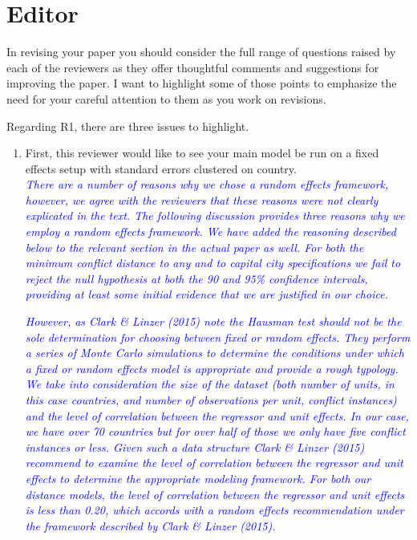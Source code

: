 \section{Editor}


In revising your paper you should consider the full range of questions raised by each of the reviewers as they offer thoughtful comments and suggestions for improving the paper. I want to highlight some of those points to emphasize the need for your careful attention to them as you work on revisions.

Regarding R1, there are three issues to highlight. 
\begin{enumerate}
\item  First, this reviewer would like to see your main model be run on a fixed effects setup with standard errors clustered on country. \\

\textcolor{blue}{\emph{
	There are a number of reasons why we chose a random effects framework, however, we agree with the reviewers that these reasons were not clearly explicated in the text. The following discussion provides three reasons why we employ a random effects framework. We have added the reasoning described below to the relevant section in the actual paper as well.
	For both the minimum conflict distance to any and to capital city specifications we fail to reject the null hypothesis at both the 90 and 95\% confidence intervals, providing at least some initial evidence that we are justified in our choice.
}}

\textcolor{blue}{\emph{
	However, as Clark \& Linzer (2015) note the Hausman test should not be the sole determination for choosing between fixed or random effects. They perform a series of Monte Carlo simulations to determine the conditions under which a fixed or random effects model is appropriate and provide a rough typology. We take into consideration the size of the dataset (both number of units, in this case countries, and number of observations per unit, conflict instances) and the level of correlation between the regressor and unit effects. In our case, we have over 70 countries but for over half of those we only have five conflict instances or less. Given such a data structure Clark \& Linzer (2015) recommend to examine the level of correlation between the regressor and unit effects to determine the appropriate modeling framework. For both our distance models, the level of correlation between the regressor and unit effects is less than 0.20, which accords with a random effects recommendation under the framework described by Clark \& Linzer (2015).
}}


\end{enumerate}
